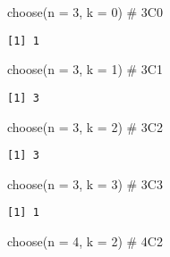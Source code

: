 \documentclass[
  letterpaper,
  DIV=11,
  numbers=noendperiod]{scrreprt}
\newenvironment{Shaded}{\begin{snugshade}}{\end{snugshade}}
\newcommand{\AttributeTok}[1]{\textcolor[rgb]{0.40,0.45,0.13}{#1}}
\newcommand{\CommentTok}[1]{\textcolor[rgb]{0.37,0.37,0.37}{#1}}
\newcommand{\DecValTok}[1]{\textcolor[rgb]{0.68,0.00,0.00}{#1}}
\newcommand{\FunctionTok}[1]{\textcolor[rgb]{0.28,0.35,0.67}{#1}}
\newcommand{\NormalTok}[1]{\textcolor[rgb]{0.00,0.23,0.31}{#1}}
\begin{document}
\begin{Shaded}
\begin{Highlighting}[]
\FunctionTok{choose}\NormalTok{(}\AttributeTok{n =} \DecValTok{3}\NormalTok{, }\AttributeTok{k =} \DecValTok{0}\NormalTok{) }\CommentTok{\# 3C0}
\end{Highlighting}
\end{Shaded}

\begin{verbatim}
[1] 1
\end{verbatim}

\begin{Shaded}
\begin{Highlighting}[]
\FunctionTok{choose}\NormalTok{(}\AttributeTok{n =} \DecValTok{3}\NormalTok{, }\AttributeTok{k =} \DecValTok{1}\NormalTok{) }\CommentTok{\# 3C1}
\end{Highlighting}
\end{Shaded}

\begin{verbatim}
[1] 3
\end{verbatim}

\begin{Shaded}
\begin{Highlighting}[]
\FunctionTok{choose}\NormalTok{(}\AttributeTok{n =} \DecValTok{3}\NormalTok{, }\AttributeTok{k =} \DecValTok{2}\NormalTok{) }\CommentTok{\# 3C2}
\end{Highlighting}
\end{Shaded}

\begin{verbatim}
[1] 3
\end{verbatim}

\begin{Shaded}
\begin{Highlighting}[]
\FunctionTok{choose}\NormalTok{(}\AttributeTok{n =} \DecValTok{3}\NormalTok{, }\AttributeTok{k =} \DecValTok{3}\NormalTok{) }\CommentTok{\# 3C3}
\end{Highlighting}
\end{Shaded}

\begin{verbatim}
[1] 1
\end{verbatim}

\begin{Shaded}
\begin{Highlighting}[]
\FunctionTok{choose}\NormalTok{(}\AttributeTok{n =} \DecValTok{4}\NormalTok{, }\AttributeTok{k =} \DecValTok{2}\NormalTok{) }\CommentTok{\# 4C2}
\end{Highlighting}
\end{Shaded}
\end{document}
